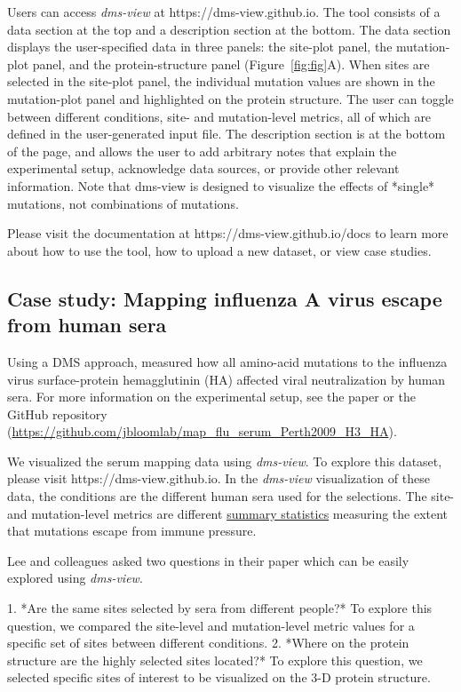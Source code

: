 Users can access \emph{dms-view} at https://dms-view.github.io.
The tool consists of a data section at the top and a description section at the bottom.
The data section displays the user-specified data in three panels: the site-plot panel, the mutation-plot panel, and the protein-structure panel (Figure~\ref{fig:fig}A).
When sites are selected in the site-plot panel, the individual mutation values are shown in the mutation-plot panel and highlighted on the protein structure.
The user can toggle between different conditions, site- and mutation-level metrics, all of which are defined in the user-generated input file.
The description section is at the bottom of the page, and allows the user to add arbitrary notes that explain the experimental setup, acknowledge data sources, or provide other relevant information.
Note that dms-view is designed to visualize the effects of *single* mutations, not combinations of mutations.

Please visit the documentation at https://dms-view.github.io/docs to learn more about how to use the tool, how to upload a new dataset, or view case studies.

\subsection{Case study: Mapping influenza A virus escape from human sera}

Using a DMS approach, \citet{Lee2019} measured how all amino-acid mutations to the influenza virus surface-protein hemagglutinin (HA) affected viral neutralization by human sera.
For more information on the experimental setup, see the paper \citep{Lee2019} or the GitHub repository (\url{https://github.com/jbloomlab/map_flu_serum_Perth2009_H3_HA}).

We visualized the \citet{Lee2019} serum mapping data using \emph{dms-view}.
To explore this dataset, please visit https://dms-view.github.io.
In the \emph{dms-view} visualization of these data, the conditions are the different human sera used for the selections.
The site- and mutation-level metrics are different \href{https://jbloomlab.github.io/dms_tools2/diffsel.html}{summary statistics} measuring the extent that mutations escape from immune pressure.

Lee and colleagues asked two questions in their paper which can be easily explored using \emph{dms-view}.

  1. *Are the same sites selected by sera from different people?* To explore this question, we compared the site-level and mutation-level metric values for a specific set of sites between different conditions.
  2. *Where on the protein structure are the highly selected sites located?* To explore this question, we selected specific sites of interest to be visualized on the 3-D protein structure.

